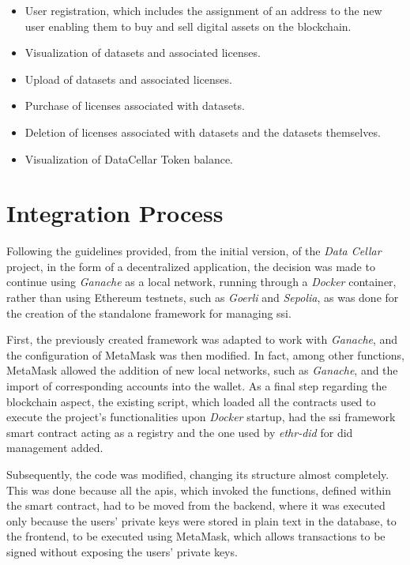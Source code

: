 \begin{itemize}
  \item User registration, which includes the assignment of an address to the new user enabling them to buy and sell digital assets on the blockchain. 
  \item Visualization of datasets and associated licenses. 
  \item Upload of datasets and associated licenses. 
  \item Purchase of licenses associated with datasets.
  \item Deletion of licenses associated with datasets and the datasets themselves.
  \item Visualization of DataCellar Token balance.
\end{itemize}

\section{Integration Process}

Following the guidelines provided, from the initial version, of the \textit{Data Cellar} project, in the form of a decentralized application, the decision was made to continue using 
\textit{Ganache} as a local network, running through a \textit{Docker} container, rather than using Ethereum testnets, such as \textit{Goerli} and \textit{Sepolia}, as was done for the creation of the 
standalone framework for managing \gls{ssi}.

First, the previously created framework was adapted to work with \textit{Ganache}, and the configuration of MetaMask was then modified. In fact, among other functions, MetaMask 
allowed the addition of new local networks, such as \textit{Ganache}, and the import of corresponding accounts into the wallet. As a final step regarding the blockchain aspect, 
the existing script, which loaded all the contracts used to execute the project's functionalities upon \textit{Docker} startup, had the \gls{ssi} framework smart contract acting as a 
registry and the one used by \textit{ethr-did} for \gls{did} management added.

Subsequently, the code was modified, changing its structure almost completely. This was done because all the \gls{api}s, which invoked the functions, defined within the smart 
contract, had to be moved from the backend, where it was executed only because the users' private keys were stored in plain text in the database, to the frontend, to be 
executed using MetaMask, which allows transactions to be signed without exposing the users' private keys.

